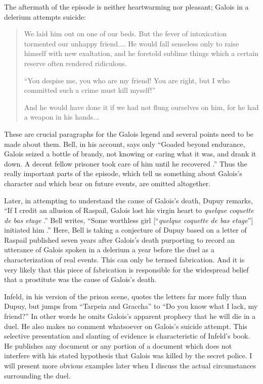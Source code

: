 \documentclass[12pt]{article}
\begin{document}
The aftermath of the episode is neither heartwarming nor pleasant; Galois in a delerium attempts suicide:

\begin{quotation}
We laid him out on one of our beds. But the fever of intoxication tormented our unhappy friend.... He would fall senseless only to raise himself with new exaltation, and he foretold sublime things which a certain reserve often rendered ridiculous. 

``You despise me, you who are my friend! You are right, but I who committed such a crime must kill myself!'' 

And he would have done it if we had not flung ourselves on him, for he had a weapon in his hands... \cite{64}
\end{quotation}
These are crucial paragraphs for the Galois legend and several points need to be made about them. Bell, in his account, says only ``Goaded beyond endurance, Galois seized a bottle of brandy, not knowing or caring what it was, and drank it down. A decent fellow prisoner took care of him until he recovered \cite{65}.'' Thus the really important parts of the episode, which tell us something about Galois's character and which bear on future events, are omitted altogether.

Later, in attempting to understand the cause of Galois's death, Dupuy remarks, ``If I credit an allusion of Raspail, Galois lost his virgin heart to {\it quelque coquette de bas etage} \cite{66}.'' Bell writes, ``Some worthless girl [``\emph{quelque coquette de bas etage}''] initiated him \cite{67}.'' Here, Bell is taking a conjecture of Dupuy based on a letter of Raspail published seven years after Galois's death purporting to record an utterance of Galois spoken in a delerium a year before the duel as a characterization of real events. This can only be termed fabrication. And it is very likely that this piece of fabrication is responsible for the widespread belief that a prostitute was the cause of Galois's death.

Infeld, in his version of the prison scene, quotes the letters far more fully than Dupuy, but jumps from ``Tarpeia and Graccha'' to ``Do you know what I lack, my friend?'' In other words he omits Galois's apparent prophecy that he will die in a duel. He also makes no comment whatsoever on Galois's suicide attempt. This selective presentation and slanting of evidence is characteristic of Infeld's book. He publishes any document or any portion of a document which does not interfere with his stated hypothesis that Galois was killed by the secret police. I will present more obvious examples later when I discuss the actual circumstances surrounding the duel.
\end{document}
